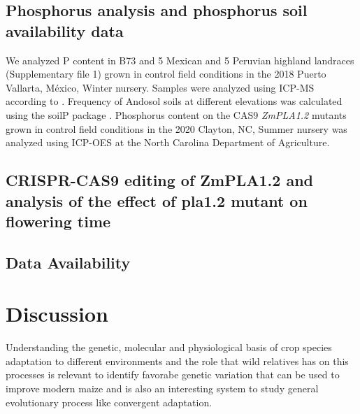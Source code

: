\documentclass[9pt,twocolumn,twoside]{BioRxiv}
\begin{document}
\subsection{Phosphorus analysis and phosphorus soil availability data}
We analyzed P content in B73 and 5 Mexican  and 5 Peruvian highland landraces (Supplementary file 1) grown in control field conditions in the 2018 Puerto Vallarta, México, Winter nursery. Samples were analyzed using ICP-MS according to \cite{Baxter2014-ch}. 
Frequency of Andosol soils at different elevations was calculated using the soilP package \cite{Rodriguez-Zapata2018-vz}.
Phosphorus content on the CAS9 \textit{ZmPLA1.2} mutants grown in control field conditions in the 2020 Clayton, NC, Summer nursery was analyzed using ICP-OES at the North Carolina Department of Agriculture.   

\subsection{CRISPR-CAS9 editing of ZmPLA1.2 and analysis of the effect of pla1.2 mutant on flowering time}

\subsection{Data Availability}

\section{Discussion}
\label{sec:discussion}
Understanding the genetic, molecular and  physiological basis of crop species adaptation to different environments and the role that wild relatives has on this processes is relevant to identify favorabe genetic variation that can be used to improve modern maize and is also an interesting system to study general evolutionary process like convergent adaptation. 
\end{document}
